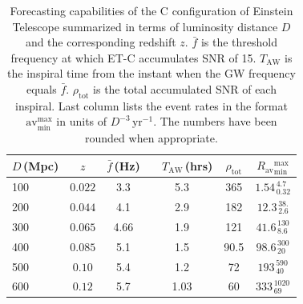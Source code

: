 \documentclass{aa}
\newcommand\T{\rule{0pt}{2.6ex}}       %
\newcommand\B{\rule[-1.2ex]{0pt}{0pt}} %
\begin{document}
%
%
%
%
\begin{table}[h]
\caption{Forecasting capabilities of the C configuration of Einstein Telescope summarized in terms
of luminosity distance $D$ and the corresponding redshift $z$.
$\bar{f}$ is the threshold frequency at which ET-C accumulates SNR of 15.
$T_\text{AW}$ is the inspiral time from the instant when the GW frequency equals $\bar{f}$.
$\rho_\text{tot}$ is the total accumulated SNR of each inspiral.
Last column lists the event rates in the format $\text{av}^\text{max}_\text{min}$ in units of $D^{-3}\,\text{yr}^{-1}$.
The numbers have been rounded when appropriate.}
\label{table:ET}
\centering
\begin{tabular}{lccccc}
\hline\hline
$D\,$(Mpc) &  $z$ & $\bar{f}\,$(Hz) & \ \hspace{1mm} $T_\text{AW}\,$(hrs)& ${\rho}_\text{tot}$ &$ R_\text{av}{}^\text{max}_\text{min}$ \T\B \\
\hline
100 & $ 0.022$ & 3.3 & 5.3 & 365 & $1.54^{\,4.7}_{\,0.32}$\T\B \\
200 & $ 0.044$ & 4.1 & 2.9 & 182 & $12.3^{\,38.}_{\,2.6}$ \T \B \\
300 & $ 0.065$ & 4.66 & 1.9 & 121 & $41.6^{\,130}_{\,8.6}$ \T \B \\
400 & $ 0.085$ & 5.1 & 1.5 & 90.5 & $98.6^{\,300}_{\,20}$ \T \B \\
500 & $ 0.10$ & 5.4 & 1.2 & 72 & $193^{\,590}_{\,40}$ \T \B \\
600 & $ 0.12$ & 5.7 & 1.03 & 60 & $333^{\,1020}_{\,69}$ \T \B \\
\hline\hline
\end{tabular}
\end{table}
%
%
%
%
%
\end{document}
